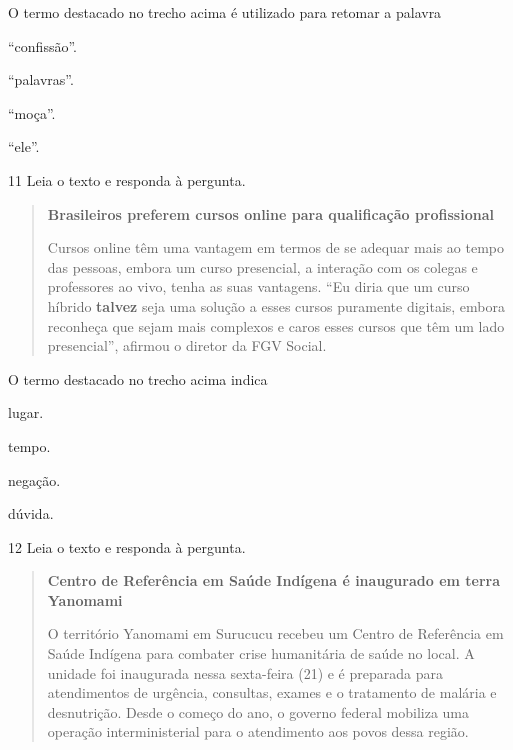 
O termo destacado no trecho acima é utilizado para retomar a palavra

\begin{escolha}
  \item ``confissão''.

  \item ``palavras''.

  \item ``moça''.

  \item ``ele''.
\end{escolha}

\num{11} Leia o texto e responda à pergunta.

\begin{quote}
\textbf{Brasileiros preferem cursos online para qualificação profissional}

Cursos online têm uma vantagem em termos de se adequar mais ao tempo das
pessoas, embora um curso presencial, a interação com os colegas e
professores ao vivo, tenha as suas vantagens. ``Eu diria que um curso
híbrido \textbf{talvez} seja uma solução a esses cursos puramente digitais,
embora reconheça que sejam mais complexos e caros esses cursos que têm
um lado presencial'', afirmou o diretor da FGV Social.
\end{quote}


O termo destacado no trecho acima indica

\begin{escolha}
  \item lugar.

  \item tempo.

  \item negação.

  \item dúvida.
\end{escolha}



\num{12} Leia o texto e responda à pergunta.

\begin{quote}
\textbf{Centro de Referência em Saúde Indígena é inaugurado em terra
Yanomami}

O território Yanomami em Surucucu recebeu um Centro de Referência em
Saúde Indígena para combater crise humanitária de saúde no local. A
unidade foi inaugurada nessa sexta-feira (21) e é preparada para
atendimentos de urgência, consultas, exames e o tratamento de malária e
desnutrição. Desde o começo do ano, o governo federal mobiliza uma
operação interministerial para o atendimento aos povos dessa região.
\end{quote}

